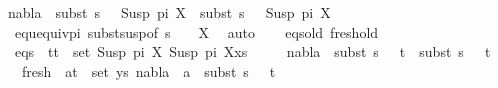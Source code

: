 \begin{isabellebody}
\ {\isachardoublequoteopen}nabla{}\ {\isasymturnstile}\ subst\ {\isacharparenleft}{\kern0pt}s{}\ {\isasymbullet}\ {\isacharbrackleft}{\kern0pt}{\isacharbrackright}{\kern0pt}{\isacharparenright}{\kern0pt}\ {\isacharparenleft}{\kern0pt}Susp\ pi{}\ X{\isacharparenright}{\kern0pt}\ {\isasymapprox}\ subst\ {\isacharparenleft}{\kern0pt}s{}\ {\isasymbullet}\ {\isacharbrackleft}{\kern0pt}{\isacharbrackright}{\kern0pt}{\isacharparenright}{\kern0pt}\ {\isacharparenleft}{\kern0pt}Susp\ pi{}\ X{\isacharparenright}{\kern0pt}{\isachardoublequoteclose}\isanewline
\ \ \ \ \isamarkupfalse%
\ \ equ{\isacharunderscore}{\kern0pt}equiv{\isacharunderscore}{\kern0pt}pi\ subst{\isacharunderscore}{\kern0pt}susp{\isacharbrackleft}{\kern0pt}of\ {\isacartoucheopen}{\isacharparenleft}{\kern0pt}s{}\ {\isasymbullet}\ {\isacharbrackleft}{\kern0pt}{\isacharbrackright}{\kern0pt}{\isacharparenright}{\kern0pt}{\isacartoucheclose}\ {\isacharunderscore}{\kern0pt}\ X{\isacharbrackright}{\kern0pt}\ \isamarkupfalse%
\ auto\isanewline
\ \ \isamarkupfalse%
\ eqs{\isacharunderscore}{\kern0pt}old\ fresh{\isacharunderscore}{\kern0pt}old\ \isamarkupfalse%
\isanewline
\ \ eqs{\isacharcolon}{\kern0pt}\ {\isachardoublequoteopen}{\isasymforall}\ {\isacharparenleft}{\kern0pt}t{}{\isacharcomma}{\kern0pt}t{}{\isacharparenright}{\kern0pt}\ {\isasymin}\ set\ {\isacharparenleft}{\kern0pt}{\isacharparenleft}{\kern0pt}Susp\ pi{}\ X{\isacharcomma}{\kern0pt}\ Susp\ pi{}\ X{\isacharparenright}{\kern0pt}{\isacharhash}{\kern0pt}xs{\isacharparenright}{\kern0pt}{\isachardot}{\kern0pt}\ \isanewline
\ \ \ \ nabla{}\ {\isasymturnstile}\ subst\ {\isacharparenleft}{\kern0pt}s{}\ {\isasymbullet}\ {\isacharbrackleft}{\kern0pt}{\isacharbrackright}{\kern0pt}{\isacharparenright}{\kern0pt}\ t{}\ {\isasymapprox}\ subst\ {\isacharparenleft}{\kern0pt}s{}\ {\isasymbullet}\ {\isacharbrackleft}{\kern0pt}{\isacharbrackright}{\kern0pt}{\isacharparenright}{\kern0pt}\ t{}{\isachardoublequoteclose}\isanewline
\ \ \ fresh{\isacharcolon}{\kern0pt}\ {\isachardoublequoteopen}{\isasymforall}\ {\isacharparenleft}{\kern0pt}a{\isacharcomma}{\kern0pt}t{\isacharparenright}{\kern0pt}\ {\isasymin}\ set\ ys{\isachardot}{\kern0pt}\ nabla{}\ {\isasymturnstile}\ a\ {\isasymsharp}\ subst\ {\isacharparenleft}{\kern0pt}s{}\ {\isasymbullet}\ {\isacharbrackleft}{\kern0pt}{\isacharbrackright}{\kern0pt}{\isacharparenright}{\kern0pt}\ t{\isachardoublequoteclose}\isanewline

\end{isabellebody}
